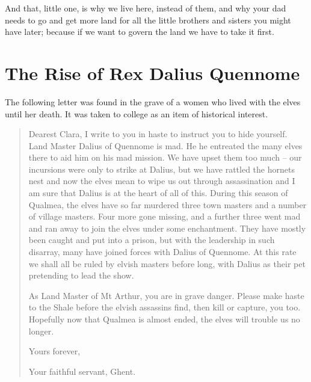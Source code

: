 \begin{multicols}{2}
\begin{exampletext}
And that, little one, is why we live here, instead of them, and why your dad needs to go and get more land for all the little brothers and sisters you might have later; because if we want to govern the land we have to take it first.

\end{exampletext}

\end{multicols}

\section{The Rise of Rex Dalius Quennome}

\begin{multicols}{2}
\label{h_dalius}

\noindent The following letter was found in the grave of a women who lived with the elves until her death.
It was taken to \gls{college} as an item of historical interest.

\begin{quotation}

  Dearest Clara, I write to you in haste to instruct you to hide yourself.
  Land Master Dalius of Quennome is mad.
  He he entreated the many elves there to aid him on his mad mission.
  We have upset them too much -- our incursions were only to strike at Dalius, but we have rattled the hornets nest and now the elves mean to wipe us out through assassination and I am sure that Dalius is at the heart of all of this.
  During this season of Qualmea, the elves have so far murdered three town masters and a number of village masters.
  Four more gone missing, and a further three went mad and ran away to join the elves under some enchantment.
  They have mostly been caught and put into a prison, but with the leadership in such disarray, many have joined forces with Dalius of Quennome.
  At this rate we shall all be ruled by elvish masters before long, with Dalius as their pet pretending to lead the show.

  As Land Master of Mt Arthur, you are in grave danger.
  Please make haste to the Shale before the elvish assassins find, then kill or capture, you too.
  Hopefully now that Qualmea is almost ended, the elves will trouble us no longer.

  Yours forever,

  Your faithful servant, Ghent.

\end{quotation}


\end{multicols}
